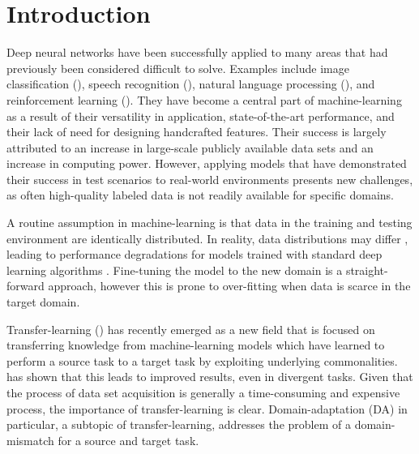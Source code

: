 \chapter{Introduction}



Deep neural networks have been successfully applied to
many areas that had previously been considered difficult to solve. 
Examples include 
image classification (\cite{Image_recognition}), 
speech recognition (\cite{Speech_recognition}), 
natural language processing (\cite{gpt3}),
and reinforcement learning (\cite{AlphaZero}).
They have become a central part of machine-learning
as a result of their versatility in application, state-of-the-art performance,
and their lack of need for designing handcrafted features.
Their success is largely attributed to an increase in large-scale publicly available
data sets and an increase in computing power.
However, applying models that have demonstrated their success in test scenarios 
to real-world environments presents new challenges, 
as often high-quality labeled data is not readily available for specific domains.

A routine assumption in machine-learning is that data 
in the training and testing environment are identically distributed. 
In reality, data distributions may differ \cite{},
leading to performance degradations for models trained with 
standard deep learning algorithms \cite{}.
Fine-tuning the model to the new domain 
is a straight-forward approach,
however this is prone to over-fitting when data is scarce in the target domain.

Transfer-learning (\cite{XFER_SURVEY}) has recently emerged as a new field that is focused on 
transferring knowledge from machine-learning models which have learned to perform a source task 
to a target task by exploiting underlying commonalities.
\cite{DA_how_transferable} has shown that 
this leads to improved results, even in divergent tasks.
Given that the process of data set acquisition is generally a time-consuming and expensive process,
the importance of transfer-learning is clear. 
Domain-adaptation (DA) in particular, a subtopic of transfer-learning,
addresses the problem of a domain-mismatch for a source and target task.

